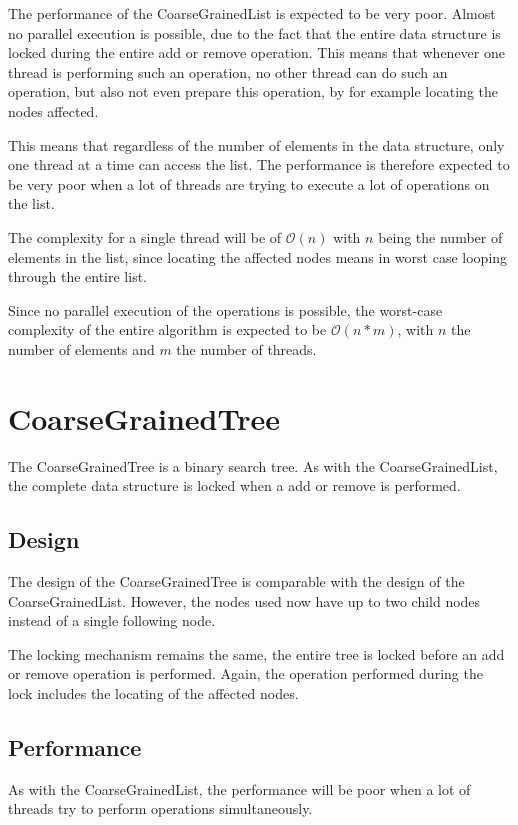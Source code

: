 \documentclass[a4paper]{article}
\begin{document}
The performance of the CoarseGrainedList is expected to be very poor. Almost
no parallel execution is possible, due to the fact that the entire
data structure is locked during the entire add or remove operation. This means
that whenever one thread is performing such an operation, no other thread can
do such an operation, but also not even prepare this operation, by for example
locating the nodes affected.

This means that regardless of the number of elements in the data structure,
only one thread at a time can access the list. The performance is therefore
expected to be very poor when a lot of threads are trying to execute a lot
of operations on the list.

The complexity for a single thread will be of $\mathcal{O}(n)$ with $n$ being
the number of elements in the list, since
locating the affected nodes means in worst case looping through the entire
list.

Since no parallel execution of the operations is possible, the worst-case
complexity of the entire algorithm is expected to be $\mathcal{O}(n * m)$,
with $n$ the number of elements and $m$ the number of threads.

\section{CoarseGrainedTree}

The CoarseGrainedTree is a binary search tree. As with the
CoarseGrainedList, the complete data structure is locked when
a add or remove is performed.

\subsection{Design}

The design of the CoarseGrainedTree is comparable with the design of the
CoarseGrainedList. However, the nodes used now have up to two child nodes
instead of a single following node.

The locking mechanism remains the same, the entire tree is locked before
an add or remove operation is performed. Again, the operation performed
during the lock includes the locating of the affected nodes.

\subsection{Performance}

As with the CoarseGrainedList, the performance will be poor when a lot of
threads try to perform operations simultaneously.
\end{document}

